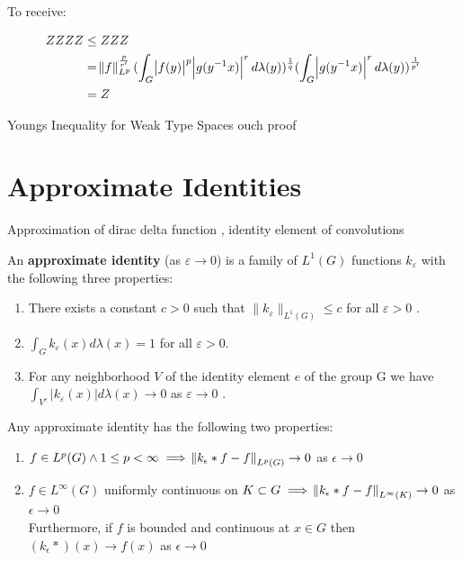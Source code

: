 To receive:

\begin{align*}
ZZZZ &\leq ZZZ \\
&= \norm{f}^\frac{p}{r'}_{L^p} (\int_G \abs{f(y)}^p\abs{g(y^{-1}x)}^r d\lambda(y) )^\frac{1}{q} (\int_G \abs{g(y^{-1}x)}^r d\lambda(y) )^\frac{1}{p'} \\
&= Z
\end{align*}

\begin{theorem}
Youngs Inequality for Weak Type Spaces
ouch proof
\end{theorem}

\section{Approximate Identities}

Approximation of dirac delta function , identity element of convolutions

\begin{definition}
An \textbf{approximate identity} (as $\varepsilon \rightarrow 0$) is a family of $L^1(G)$ functions $k_\varepsilon$ with the following three properties: 
\begin{enumerate}[label=(\roman*)]
\item There exists a constant $c > 0$ such that $\| k_\varepsilon \| _ {L^1(G)} \leqslant c$ for all $ \varepsilon > 0 $ . 
\item $ \int_G k_\varepsilon(x) d\lambda(x) = 1$ for all $\varepsilon > 0 $.
\item For any neighborhood $V$ of the identity element $e$ of the group G we have $ \int_{V^c} | k_\varepsilon(x) | d \lambda(x) \rightarrow 0  $ as $ \varepsilon \rightarrow 0 $ . 
\end{enumerate}
\end{definition}

\begin{theorem}
Any approximate identity has the following two properties:
\begin{enumerate}
\item $f \in L^p(G) \wedge 1 \leq p < \infty \implies \norm{k_\epsilon \ast f - f}_{L^p(G)} \to 0 $ as $ \epsilon \to 0$
\item $f \in L^\infty(G)$ uniformly continuous on $K \subset G \implies \norm{k_\epsilon \ast f - f}_{L^\infty(K)} \to 0$ as $\epsilon \to 0$ \\
Furthermore, if $f$ is bounded and continuous at $x \in G$ then
$ (k_\epsilon \ast )(x) \to f(x) $ as $\epsilon \to 0$ 
\end{enumerate}
\end{theorem}

